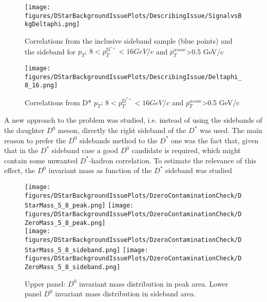 \begin{figure}
\centering
{\texttt{[image: figures/DStarBackgroundIssuePlots/DescribingIssue/SignalvsBkgDeltaphi.png]}}
 \caption{Correlations from the inclusive sideband sample (blue points) and the sideband for  $p_{T}$: $8< p_{T}^{\text{D}^{*+}}< 16 GeV/c$ and $p_{T}^{assoc}$>0.5 GeV/c} 
\label{fig:DStarBkgIssue_SigvsBkgDphi}
\end{figure}

\begin{figure}
\centering
{\texttt{[image: figures/DStarBackgroundIssuePlots/DescribingIssue/Deltaphi\_8\_16.png]}}
 \caption{Correlations from D*  $p_{T}$: $8< p_{T}^{\text{D}^{*+}}< 16 GeV/c$ and $p_{T}^{assoc}$>0.5 GeV/c} 
\label{fig:DStarBkgIssue_Dphi}
\end{figure}

A new approach to the problem was studied, i.e. instead of using the sidebands of the daughter $D^{0}$ meson, directly the right sideband of the $D^{*}$ was used. The main reason to prefer the $D^{0}$ sidebands method to the $D^{*}$ one was the fact that, given that in the $D^{*}$ sideband case a good $D^{0}$ candidate is required, which might contain some unwanted $D^{*}$-hadron correlation. To estimate the relevance of this effect, the $D^{0}$ invariant mass as function of the $D^{*}$ sideband was studied
\begin{figure}
\centering
{\texttt{[image: figures/DStarBackgroundIssuePlots/DzeroContaminationCheck/DStarMass\_5\_8\_peak.png]}}
{\texttt{[image: figures/DStarBackgroundIssuePlots/DzeroContaminationCheck/DZeroMass\_5\_8\_peak.png]}}\\

{\texttt{[image: figures/DStarBackgroundIssuePlots/DzeroContaminationCheck/DStarMass\_5\_8\_sideband.png]}}
{\texttt{[image: figures/DStarBackgroundIssuePlots/DzeroContaminationCheck/DZeroMass\_5\_8\_sideband.png]}}\\
\caption{Upper panel: $D^{0}$ invariant mass distribution in peak area. Lower panel $D^{0}$ invariant mass distribution in sideband area.} 
\label{fig:DStarBkgIssue_DZeroContamination}
\end{figure}

